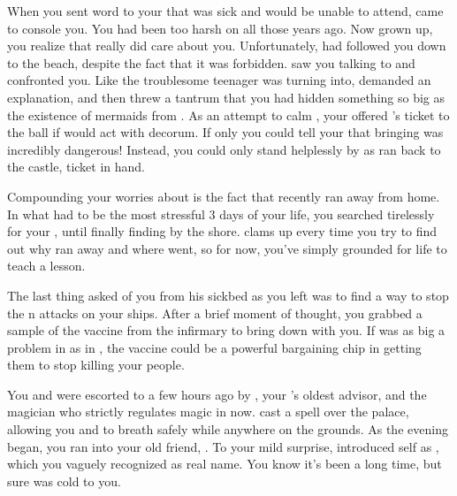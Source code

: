 \documentclass[char]{NeptuneBall}
\begin{document}
When you sent word to your \cKing{\parent} that \cEric{} was sick and would be unable to attend, \cKing{} came to console you. You had been too harsh on \cKing{\them} all those years ago. Now grown up, you realize that \cKing{} really did care about you. Unfortunately, \cWillow{} had followed you down to the beach, despite the fact that it was forbidden. \cWillow{\They} saw you talking to \cKing{} and confronted you. Like the troublesome teenager \cWillow{\they} was turning into, \cWillow{} demanded an explanation, and then threw a tantrum that you had hidden something so big as the existence of mermaids from \cWillow{\them}. As an attempt to calm \cWillow{}, your \cKing{\parent} offered \cWillow{\them} \cEric{}'s ticket to the ball if \cWillow{\they} would act with decorum. If only you could tell your \cKing{\parent} that bringing \cWillow{} was incredibly dangerous! Instead, you could only stand helplessly by as \cWillow{} ran back to the castle, ticket in hand.

Compounding your worries about \cWillow{} is the fact that \cWillow{\they} recently ran away from home. In what had to be the most stressful 3 days of your life, you searched tirelessly for your \cWillow{\offspring}, until finally finding \cWillow{\them} by the shore. \cWillow{} clams up every time you try to find out why \cWillow{\they} ran away and where \cWillow{\they} went, so for now, you've simply grounded \cWillow{\them} for life to teach \cWillow{\them} a lesson.

The last thing \cEric{} asked of you from his sickbed as you left was to find a way to stop the \pPacifica{}n attacks on your ships. After a brief moment of thought, you grabbed a sample of the \cPolio{} vaccine from the infirmary to bring down with you. If \cPolio{} was as big a problem in \pPacifica{} as in \pAtlantis{}, the \cPolio{} vaccine could be a powerful bargaining chip in getting them to stop killing your people. 

You and \cWillow{} were escorted to \pAtlantis{} a few hours ago by \cManta{}, your \cKing{\parent}'s oldest advisor, and the magician who strictly regulates magic in \pAtlantis{} now. \cManta{} cast a spell over the palace, allowing you and \cWillow{} to breath safely while anywhere on the grounds. As the evening began, you ran into your old friend, \cPriest{}. To your mild surprise, \cPriest{\they} introduced \cPriest{\them}self as \cPriest{\MYname}, which you vaguely recognized as \cPriest{\their} real name. You know it's been a long time, but \cPriest{} sure was cold to you.
\end{document}
